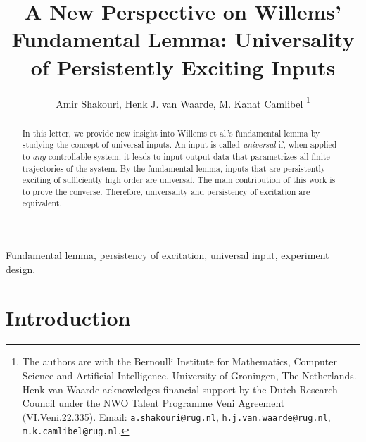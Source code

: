 \documentclass[journal,twoside,web]{ieeecolor}
\begin{document}
\title{A New Perspective on Willems' Fundamental Lemma: Universality of Persistently Exciting Inputs
}
\author{Amir Shakouri, Henk J. van Waarde, M. Kanat Camlibel
\thanks{The authors are with the Bernoulli Institute for Mathematics, Computer Science and Artificial Intelligence, University of Groningen, The Netherlands. Henk van Waarde acknowledges financial support by the Dutch Research Council under the NWO Talent Programme Veni Agreement (VI.Veni.22.335). Email:
        {\tt\small a.shakouri@rug.nl}, {\tt\small h.j.van.waarde@rug.nl}, {\tt\small m.k.camlibel@rug.nl}.}%
}


\maketitle
\thispagestyle{empty}


\begin{abstract}
In this letter, we provide new insight into Willems et al.'s fundamental lemma by studying the concept of universal inputs. An input is called \emph{universal} if, when applied to \emph{any} controllable system, it leads to input-output data that parametrizes all finite trajectories of the system. By the fundamental lemma, inputs that are persistently exciting of sufficiently high order are universal. The main contribution of this work is to prove the converse. Therefore, universality and persistency of excitation are equivalent.
\end{abstract}

\begin{IEEEkeywords}
Fundamental lemma, persistency of excitation, universal input, experiment design.
\end{IEEEkeywords}

\section{Introduction}
\end{document}
